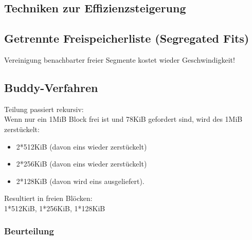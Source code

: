 \subsection{Techniken zur Effizienzsteigerung}
\subsection{Getrennte Freispeicherliste (Segregated Fits)}
Vereinigung benachbarter freier Segmente kostet wieder Geschwindigkeit!
\subsection{Buddy-Verfahren}
Teilung passiert rekursiv:\\
Wenn nur ein 1MiB Block frei ist und 78KiB gefordert sind, wird des 1MiB zerstückelt:
\begin{itemize}
\item 2*512KiB (davon eins wieder zerstückelt)
\item 2*256KiB (davon eins wieder zerstückelt)
\item 2*128KiB (davon wird eins ausgeliefert).
\end{itemize}
Resultiert in freien Blöcken:\\
1*512KiB, 1*256KiB, 1*128KiB
\subsubsection*{Beurteilung}





